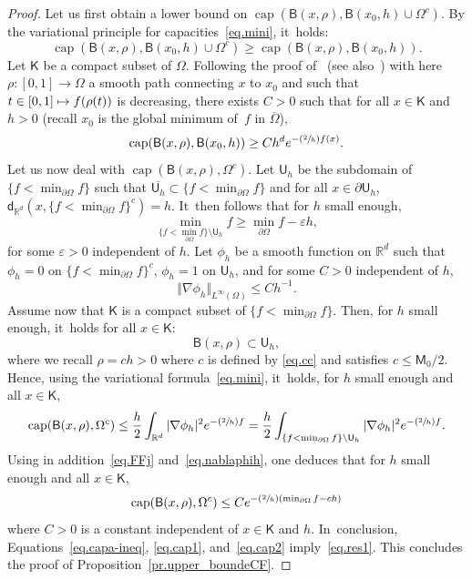 \documentclass[10pt]{amsart}
\newcommand{\Psfrac}[2]{(\sfrac{#1}{#2})}
\let\epsilon\varepsilon
\newcommand\mto{\mathchoice{\longmapsto}{\mapsto}{\mapsto}{\mapsto}}
\DeclareMathOperator{\capp}{cap}
\theoremstyle{plain}
\theoremstyle{definition}
\begin{document}
\begin{proof}
Let us first obtain a lower bound on $\capp(\mathsf B(x,\rho), \mathsf B(x_0,h) \cup \Omega^c)$.
By the variational principle for capacities~\eqref{eq.mini}, it~holds:
\[
\capp(\mathsf B(x,\rho), \mathsf B(x_0,h) \cup \Omega^c)\ge \capp(\mathsf B(x,\rho), \mathsf B(x_0,h)).
\]
Let $\mathsf K$ be a compact subset of $\Omega$.
Following the proof of~\cite[Lem.\,7.10]{landim2017dirichlet} (see also~\cite[Prop.\,4.7]{BEGK}) with here $\rho:[0,1]\to \Omega$ a smooth path connecting $x$ to $x_0$ and such that $t\in [0,1]\mto f(\rho(t))$ is decreasing, there exists $C>0$ such that for all $x\in \mathsf K$ and $h>0$ (recall $x_0$ is the global minimum of~$f$ in $\overline{\Omega}$),
\begin{equation}\label{eq.cap1}
\capp(\mathsf B(x,\rho), \mathsf B(x_0,h))\ge C h^d e^{-\Psfrac 2h f(x)}.
\end{equation}
Let us now deal with $\capp(\mathsf B(x,\rho), \Omega^c) $.
Let
$\mathsf U_h$ be the subdomain of $\{f<\min_{\partial \Omega}f\}$ such that $\overline{\mathsf U_h }\subset \{f<\min_{\partial \Omega}f\} $ and for all $x\in \partial \mathsf U_h$,
$\mathsf d_{\mathbb R^d}(x, {\{f<\min_{\partial \Omega}f\} }^c)=h$. It~then follows that for $h$ small enough,
\begin{equation}\label{eq.FFj}
\min_{\{f<\min_{\partial \Omega}f\} \setminus {\mathsf U_h }} f\ge \min_{\partial \Omega}f -\epsilon h,
\end{equation}
for some $\epsilon >0$ independent of $h$. Let $\phi_h$ be a smooth function on $\mathbb R^d$ such that $\phi_h=0$ on $\{f<\min_{\partial \Omega}f\}^c$, $\phi_h=1$ on $ \mathsf U_h $, and for some $C>0$ independent of $h$,
\begin{equation}\label{eq.nablaphih}
\Vert \nabla \phi_h\Vert _{L^\infty(\Omega)}\le Ch^{-1}.
\end{equation}
Assume now that $\mathsf K$ is a compact subset of $\{f<\min_{\partial \Omega}f\}$. Then, for $h$ small enough, it~holds for all $x\in \mathsf K$:
\[
{\mathsf B(x,\rho)}\subset \mathsf U_h,
\]
where we recall $\rho=ch>0$ where $c$ is defined by \eqref{eq.cc} and satisfies $c\le \mathsf M_0/2$.
Hence, using the variational formula~\eqref{eq.mini}, it~holds, for $h$ small enough and all $x\in \mathsf K$,
\[
\capp(\mathsf B(x,\rho), \Omega^c) \le \frac h2 \int_{\mathbb R^d} \vert\nabla \phi_h \vert^2e^{-\Psfrac 2h f}= \frac h2 \int_{\{f<\min_{\partial \Omega}f\} \setminus {\mathsf U_h }} \vert\nabla \phi_h \vert^2e^{-\Psfrac 2h f}.
\]
Using in addition~\eqref{eq.FFj} and~\eqref{eq.nablaphih}, one deduces that for $h$ small enough and all $x\in \mathsf K$,
\begin{equation}\label{eq.cap2}
\capp(\mathsf B(x,\rho), \Omega^c) \le C e^{-\Psfrac 2h (\min_{\partial \Omega}f -ch)}
\end{equation}
where $C>0$ is a constant independent of $x\in \mathsf K$ and $h$. In~conclusion, Equations~\eqref{eq.capa-ineq}, \eqref{eq.cap1}, and~\eqref{eq.cap2} imply~\eqref{eq.res1}. This concludes the proof of Proposition~\ref{pr.upper_boundeCF}.
\end{proof}
\end{document}
